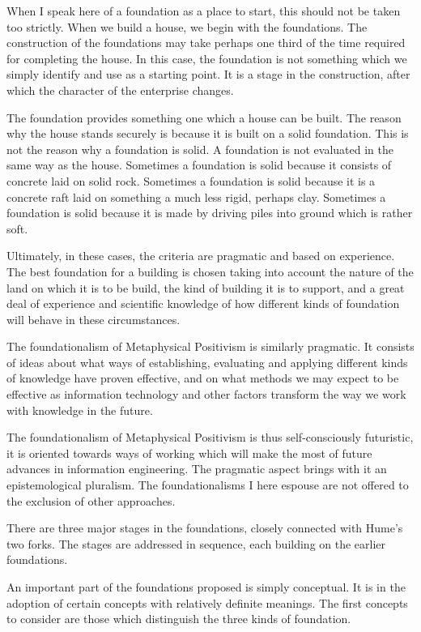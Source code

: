 When I speak here of a foundation as a place to start, this should not
be taken too strictly.
When we build a house, we begin with the foundations.
The construction of the foundations may take perhaps one third of the
time required for completing the house.
In this case, the foundation is not something which we simply identify
and use as a starting point.
It is a stage in the construction, after which the character of the
enterprise changes.

The foundation provides something one which a house can be built.
The reason why the house stands securely is because it is built on a
solid foundation.
This is not the reason why a foundation is solid.
A foundation is not evaluated in the same way as the house.
Sometimes a foundation is solid because it consists of concrete laid
on solid rock.
Sometimes a foundation is solid because it is a concrete raft laid on
something a much less rigid, perhaps clay.
Sometimes a foundation is solid because it is made by driving piles
into ground which is rather soft.

Ultimately, in these cases, the criteria are pragmatic and based on
experience.
The best foundation for a building is chosen taking into account the
nature of the land on which it is to be build, the kind of building it
is to support, and a great deal of experience and scientific knowledge
of how different kinds of foundation will behave in these
circumstances.

The foundationalism of Metaphysical Positivism is similarly pragmatic.
It consists of ideas about what ways of establishing, evaluating and
applying different kinds of knowledge have proven effective, and on
what methods we may expect to be effective as information technology
and other factors transform the way we work with knowledge in the
future.

The foundationalism of Metaphysical Positivism is thus
self-consciously futuristic, it is oriented towards ways of working
which will make the most of future advances in information
engineering. 
The pragmatic aspect brings with it an epistemological pluralism.
The foundationalisms I here espouse are not offered to the exclusion
of other approaches.

There are three major stages in the foundations, closely connected
with Hume's two forks.
The stages are addressed in sequence, each building on the earlier
foundations.

An important part of the foundations proposed is simply conceptual.
It is in the adoption of certain concepts with relatively definite
meanings.
The first concepts to consider are those which distinguish the three
kinds of foundation.

